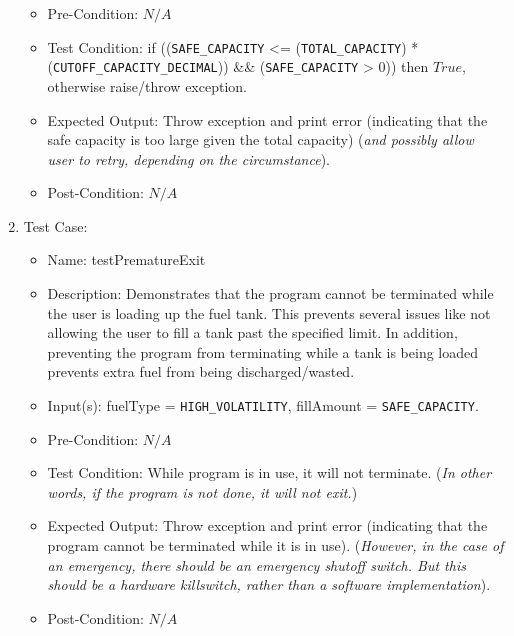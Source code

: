 \documentclass{article}
\begin{document}
\begin{enumerate}
\begin{itemize}
            \item Pre-Condition: $N/A$
            \item Test Condition: if ((\texttt{SAFE\_CAPACITY} <= (\texttt{TOTAL\_CAPACITY}) * (\texttt{CUTOFF\_CAPACITY\_DECIMAL})) \&\& (\texttt{SAFE\_CAPACITY} > 0)) then $True$, otherwise raise/throw exception.
            \item Expected Output: Throw exception and print error (indicating that the safe capacity is too large given the total capacity) (\textit{and possibly allow user to retry, depending on the circumstance}).
            \item Post-Condition: $N/A$
        \end{itemize}
    \item Test Case: \textit{}
        \begin{itemize}
            \item Name: testPrematureExit
            \item Description: Demonstrates that the program cannot be terminated while the user is loading up the fuel tank. This prevents several issues like not allowing the user to fill a tank past the specified limit. In addition, preventing the program from terminating while a tank is being loaded prevents extra fuel from being discharged/wasted.
            \item Input(s): fuelType = \texttt{HIGH\_VOLATILITY}, fillAmount = \texttt{SAFE\_CAPACITY}.
            \item Pre-Condition: $N/A$
            \item Test Condition: While program is in use, it will not terminate. (\textit{In other words, if the program is not done, it will not exit.})
            \item Expected Output: Throw exception and print error (indicating that the program cannot be terminated while it is in use). (\textit{However, in the case of an emergency, there should be an emergency shutoff switch. But this should be a hardware killswitch, rather than a software implementation}).
            \item Post-Condition: $N/A$
        \end{itemize}

\end{enumerate}
\end{document}
